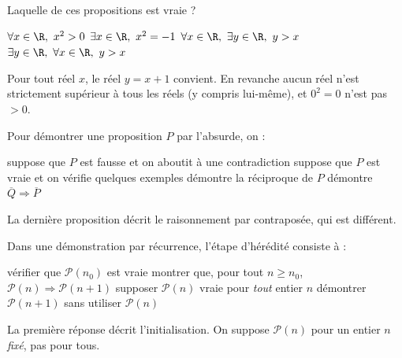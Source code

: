 \begin{question}
Laquelle de ces propositions est vraie ?
\begin{reponses}
  \mauvaise $\forall x\in\R,\ x^2>0$
  \mauvaise $\exists x\in\R,\ x^2=-1$
  \bonne $\forall x\in\R,\ \exists y\in\R,\ y>x$
  \mauvaise $\exists y\in\R,\ \forall x\in\R,\ y>x$
\end{reponses}
\begin{explication}
Pour tout réel $x$, le réel $y=x+1$ convient. En revanche aucun réel n'est strictement supérieur à tous les réels (y compris lui-même), et $0^2=0$ n'est pas $>0$.
\end{explication}
\end{question}

\begin{question}
Pour démontrer une proposition $P$ par l'absurde, on :
\begin{reponses}
  \bonne suppose que $P$ est fausse et on aboutit à une contradiction
  \mauvaise suppose que $P$ est vraie et on vérifie quelques exemples
  \mauvaise démontre la réciproque de $P$
  \mauvaise démontre $\overline{Q}\Rightarrow\overline{P}$
\end{reponses}
\begin{explication}
La dernière proposition décrit le raisonnement par contraposée, qui est différent.
\end{explication}
\end{question}

\begin{question}
Dans une démonstration par récurrence, l'étape d'hérédité consiste à :
\begin{reponses}
  \mauvaise vérifier que $\mathcal{P}(n_0)$ est vraie
  \bonne montrer que, pour tout $n\ge n_0$, $\mathcal{P}(n)\Rightarrow\mathcal{P}(n+1)$
  \mauvaise supposer $\mathcal{P}(n)$ vraie pour \emph{tout} entier $n$
  \mauvaise démontrer $\mathcal{P}(n+1)$ sans utiliser $\mathcal{P}(n)$
\end{reponses}
\begin{explication}
La première réponse décrit l'initialisation. On suppose $\mathcal P(n)$ pour un entier $n$ \emph{fixé}, pas pour tous.
\end{explication}
\end{question}
